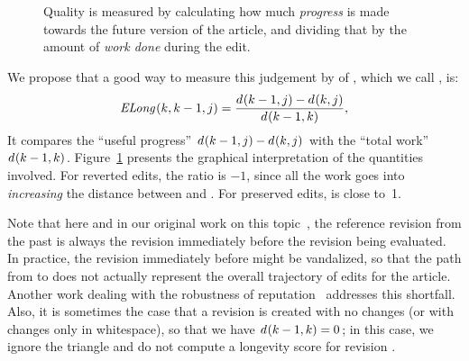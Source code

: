 \begin{figure}
\centering
{}
\caption{Quality is measured by calculating how much \textit{progress}
	is made towards the future version of the article,
	and dividing that by the amount of \textit{work done}
	during the edit.}
\label{fig-editlong}
\end{figure}

We propose that a good way to measure this judgement
by  of ,
which we call , is:
\begin{equation}
\esurv{}{k,k-1,j} = \frac{\dist{}{k-1,j} - \dist{}{k,j}}
                        {\dist{}{k-1,k}},
\label{eq:esurv}
\end{equation}
It compares the ``useful progress''
$d_{}(k-1,j) - d_{}(k,j)$
with the ``total work''
$d_{}(k-1,k)$.
Figure~\ref{fig-editlong} presents the graphical interpretation
of the quantities involved.
  For reverted edits, the ratio 
  is $-1$, since all the work
  goes into \textit{increasing} the distance between  and .
  For preserved edits,  is close to~1.

Note that here and in our original work on
this topic~\cite{Adler2007}, the reference revision from the past is always
the revision immediately before the revision being evaluated.
In practice, the revision immediately before might be vandalized,
so that the path from  to  does not
actually represent the overall trajectory of edits for the
article.
Another work dealing with
the robustness of reputation~\cite{Chatterjee2008} addresses this
shortfall.
Also, it is sometimes the case that a revision is created with
no changes (or with changes only in whitespace), so that we
have $d_{}(k-1,k) = 0$; in this case, we ignore the triangle
and do not compute a longevity score for revision .

